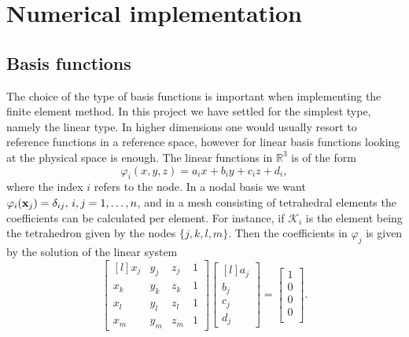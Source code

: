 \section{Numerical implementation}
\subsection{Basis functions}
The choice of the type of basis functions is important when implementing the finite element method. In this project we have settled for the simplest type, namely the linear type. In higher dimensions one would usually resort to reference functions in a reference space, however for linear basis functions looking at the physical space is enough. The linear functions in $\mathbb{R}^3$ is of the form
\begin{equation}
	\varphi_i(x,y,z) = a_ix + b_iy + c_iz + d_i,
\end{equation}
where the index $i$ refers to the node. In a nodal basis we want $\varphi_i(\vb{x}_j) = \delta_{ij},\, i,j = 1,\dots,n$, and in a mesh consisting of tetrahedral elements the coefficients can be calculated per element. For instance, if $\mathcal{K}_i$ is the element being the tetrahedron given by the nodes $\{j,k,l,m\}$. Then the coefficients in $\varphi_j$ is given by the solution of the linear system
\begin{equation}
    \begin{bmatrix*}[l]
        x_j & y_j & z_j & 1 \\
        x_k & y_k & z_k & 1 \\
        x_l & y_l & z_l & 1 \\
        x_m & y_m & z_m & 1
     \end{bmatrix*}
     \begin{bmatrix*}[l]
        a_j \\
        b_j \\
        c_j \\
        d_j 
    \end{bmatrix*}
    =
    \begin{bmatrix}
        1 \\
        0 \\
        0 \\
        0 \\
    \end{bmatrix}.
    \label{eq:coeff_sys}
\end{equation}

